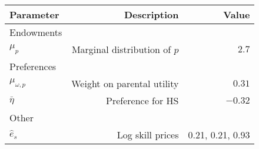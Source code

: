 \begin{tabular}{lrr}
\hline
Parameter & Description  & Value  \\
\hline
Endowments &   &   \\
$\mu_{p}$ & Marginal distribution of $p$  & $2.7$  \\
Preferences &   &   \\
$\mu_{\omega,p}$ & Weight on parental utility  & $0.31$  \\
$\bar{\eta}$ & Preference for HS  & $-0.32$  \\
Other &   &   \\
$\hat{e}_{s}$ & Log skill prices  & 0.21, 0.21, 0.93  \\
\hline
\end{tabular}%
